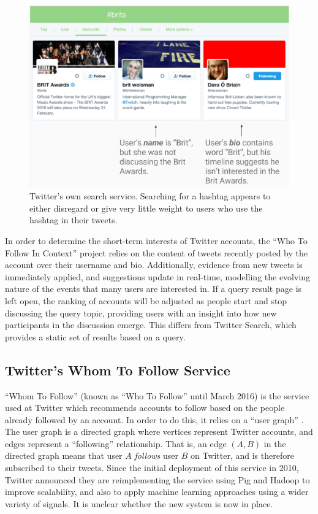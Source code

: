 \documentclass{l4proj}
\begin{document}
\begin{figure}[H]
\centering
\includegraphics[scale=0.45]{twittersearch.png}
\caption{Twitter's own search service. Searching for a hashtag appears to either disregard or give very little weight to users who use the hashtag in their tweets.}
\label{twittersearch}
\end{figure}

In order to determine the short-term interests of Twitter accounts, the ``Who To Follow In Context'' project relies on the content of tweets recently posted by the account over their username and bio. Additionally,
evidence from new tweets is immediately applied, and suggestions update in real-time, modelling the evolving nature of the events that many users are interested in. If a query result page is left open, the ranking of accounts will be adjusted as people start and stop discussing the query topic, providing users with an insight into how new participants in the discussion emerge. This differs from Twitter Search, which provides a static set of results based on a query.

\subsection{Twitter's Whom To Follow Service}
``Whom To Follow'' (known as ``Who To Follow'' until March 2016) is the service used at Twitter which recommends accounts to follow based on the people already followed by an account. In order to do this, it relies on a ``user graph'' \cite{twitterWTF}. The user graph is a directed graph where vertices represent Twitter accounts, and edges represent a ``following'' relationship. That is, an edge $(A, B)$ in the directed graph means that user $A$ \textit{follows} user $B$ on Twitter, and is therefore subscribed to their tweets. Since the initial deployment of this service in 2010, Twitter announced they are reimplementing the service using Pig and Hadoop to improve scalability, and also to apply machine learning approaches using a wider variety of signals. It is unclear whether the new system is now in place.
\end{document}
